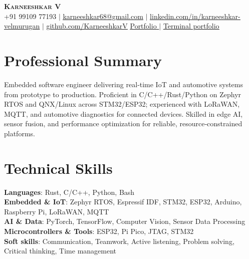 \documentclass[letterpaper,11pt]{article}
\begin{document}
\begin{center}
  \textbf{\Huge \scshape Karneeshkar V} \\ \vspace{1pt}
  \small +91 99109 77193 $|$ 
  \href{mailto:karneeshkar68@gmail.com}{\underline{karneeshkar68@gmail.com}} $|$
  \href{https://www.linkedin.com/in/karneeshkar-velmurugan/}{\underline{linkedin.com/in/karneeshkar-velmurugan}} $|$
  \href{https://github.com/KarneeshkarV}{\underline{github.com/KarneeshkarV}} 
\newline \newline
\href{https://karneeshkar.tech/}{\underline{Portfolio}  }$|$
\href{https://www.karneeshkar.tech/#terminal}{\underline{Terminal portfolio}}
\end{center}

\section{Professional Summary}
Embedded software engineer delivering real‑time IoT and automotive systems from prototype to production. Proficient in C/C++/Rust/Python on Zephyr RTOS and QNX/Linux across STM32/ESP32; experienced with LoRaWAN, MQTT, and automotive diagnostics for connected devices. Skilled in edge AI, sensor fusion, and performance optimization for reliable, resource‑constrained platforms.

\section{Technical Skills}
\begin{itemize}[leftmargin=0.15in, label={}]
  \small{\item{
    \textbf{Languages}{: Rust, C/C++, Python, Bash} \\
    \textbf{Embedded \& IoT}{: Zephyr RTOS, Espressif IDF, STM32, ESP32, Arduino, Raspberry Pi, LoRaWAN, MQTT} \\
    \textbf{AI \& Data}{: PyTorch, TensorFlow, Computer Vision, Sensor Data Processing} \\
     \textbf{Microcontrollers \& Tools}{: ESP32, Pi Pico, JTAG, STM32} \\
          \textbf{Soft skills}{: Communication, Teamwork, Active listening, Problem solving, Critical thinking, Time management}}}
\end{itemize}
\end{document}
